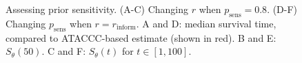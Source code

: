 \documentclass[12pt]{article}
\newcommand{\psens}{p_\text{sens}}
\newcommand{\inform}{{_{\text{inform}}}}
\begin{document}
\begin{figure}
  \caption{%
    Assessing prior sensitivity.
    (A-C) Changing $r$ when $\psens = 0.8$.
    (D-F) Changing $\psens$ when $r = r\inform$.
    A and D: median survival time, compared to ATACCC-based estimate (shown in red).
    B and E: $S_\theta(50)$.
    C and F: $S_\theta(t)$ for $t \in [1, 100]$.
  }
  \label{imperf-test:fig:cis-sensitivity}
\end{figure}
\end{document}
